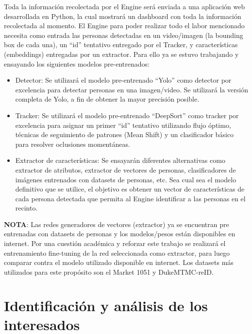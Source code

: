\documentclass[11pt]{charter}
\begin{document}
\newpage

Toda la información recolectada por el Engine será enviada a una aplicación web desarrollada en Python, la cual mostrará un dashboard con toda la información recolectada al momento. El Engine para poder realizar todo el labor mencionado necesita como entrada las personas detectadas en un video/imagen (la bounding box de cada una), un “id” tentativo entregado por el Tracker, y características (embeddings)  entregadas por un extractor. Para ello ya se estuvo trabajando y ensayando los siguientes modelos pre-entrenados:

\begin{itemize}
\item Detector: Se utilizará el modelo pre-entrenado “Yolo” como detector por excelencia para detectar personas en una imagen/video. Se utilizará la versión completa de Yolo, a fin de obtener la mayor precisión posible.
\item Tracker: Se utilizará el modelo pre-entrenado “DeepSort” como tracker por excelencia para asignar un primer “id” tentativo utilizando flujo óptimo, técnicas de seguimiento de patrones (Mean Shift) y un clasificador básico para resolver oclusiones momentáneas.
\item Extractor de características: Se ensayarán diferentes alternativas como extractor de atributos, extractor de vectores de personas, clasificadores de imágenes entrenados con datasets de personas, etc. Sea cual sea el modelo definitivo que se utilice, el objetivo es obtener un vector de características de cada persona detectada que permita al Engine identificar a las personas en el recinto.
\end{itemize}

\textbf{NOTA}: Las redes generadores de vectores (extractor) ya se encuentran pre entrenadas con datasets de personas y los modelos/pesos están disponibles en internet. Por una cuestión académica y reforzar este trabajo se realizará el entrenamiento fine-tuning de la red seleccionada como extractor, para luego comparar contra el modelo utilizado disponible en internet. Los datasets más utilizados para este propósito son el Market 1051 y DukeMTMC-reID.


\section{Identificación y análisis de los interesados}
\label{sec:interesados}
\end{document}
